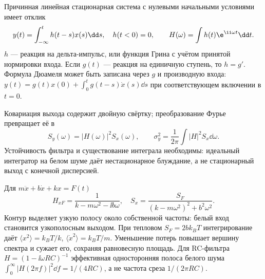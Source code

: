 
Причинная линейная стационарная система с нулевыми начальными условиями имеет отклик
\begin{equation}
 y(t)=\int_{-\infty}^th(t-s)x(s)\dd s,\quad h(t<0)=0,
 \qquad H(\omega)=\int h(t)\e^{\ii\omega t}\dd t.
\end{equation}
$h$ — реакция на дельта-импульс, или функция Грина с учётом принятой нормировки входа. Если $g(t)$ — реакция на единичную ступень, то $h=g'$. Формула Дюамеля может быть записана через $g$ и производную входа: $y(t)=g(t)x(0)+\int_0^tg(t-s)\dot x(s)\dd s$ при соответствующем включении в $t=0$.

Ковариация выхода содержит двойную свёртку; преобразование Фурье превращает её в
\begin{equation}
 S_y(\omega)=|H(\omega)|^2S_x(\omega),\qquad
 \sigma_y^2=\frac1{2\pi}\int|H|^2S_x\dd\omega.
\end{equation}
Устойчивость фильтра и существование интеграла необходимы: идеальный интегратор на белом шуме даёт нестационарное блуждание, а не стационарный выход с конечной дисперсией.

Для $m\ddot x+b\dot x+kx=F(t)$
\begin{equation}
 H_{xF}=\frac1{k-m\omega^2-\ii b\omega},\quad
 S_x=\frac{S_F}{(k-m\omega^2)^2+b^2\omega^2}.
\end{equation}
Контур выделяет узкую полосу около собственной частоты: белый вход становится узкополосным выходом. При тепловом $S_F=2bk_BT$ интегрирование даёт $\langle x^2\rangle=k_BT/k$, $\langle\dot x^2\rangle=k_BT/m$. Уменьшение потерь повышает вершину спектра и сужает его, сохраняя равновесную площадь. Для RC-фильтра $H=(1-\ii\omega RC)^{-1}$ эффективная односторонняя полоса белого шума $\int_0^\infty|H(2\pi f)|^2\dd f=1/(4RC)$, а не частота среза $1/(2\pi RC)$.
